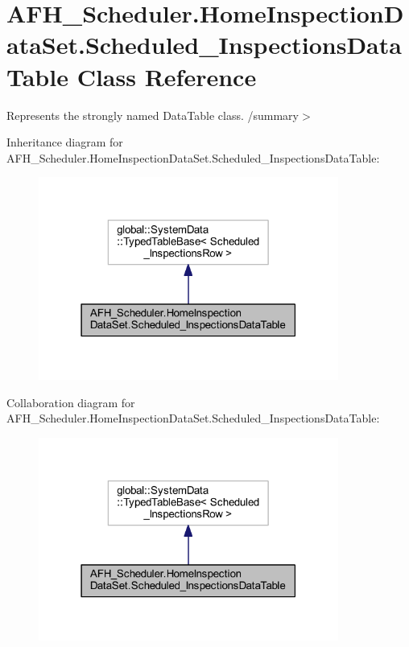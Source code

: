 \section{A\+F\+H\+\_\+\+Scheduler.\+Home\+Inspection\+Data\+Set.\+Scheduled\+\_\+\+Inspections\+Data\+Table Class Reference}
\label{class_a_f_h___scheduler_1_1_home_inspection_data_set_1_1_scheduled___inspections_data_table}


Represents the strongly named Data\+Table class. /summary$>$  




Inheritance diagram for A\+F\+H\+\_\+\+Scheduler.\+Home\+Inspection\+Data\+Set.\+Scheduled\+\_\+\+Inspections\+Data\+Table\+:
\nopagebreak
\begin{figure}[H]
\begin{center}
\leavevmode
\includegraphics[width=279pt]{class_a_f_h___scheduler_1_1_home_inspection_data_set_1_1_scheduled___inspections_data_table__inherit__graph}
\end{center}
\end{figure}


Collaboration diagram for A\+F\+H\+\_\+\+Scheduler.\+Home\+Inspection\+Data\+Set.\+Scheduled\+\_\+\+Inspections\+Data\+Table\+:
\nopagebreak
\begin{figure}[H]
\begin{center}
\leavevmode
\includegraphics[width=279pt]{class_a_f_h___scheduler_1_1_home_inspection_data_set_1_1_scheduled___inspections_data_table__coll__graph}
\end{center}
\end{figure}
